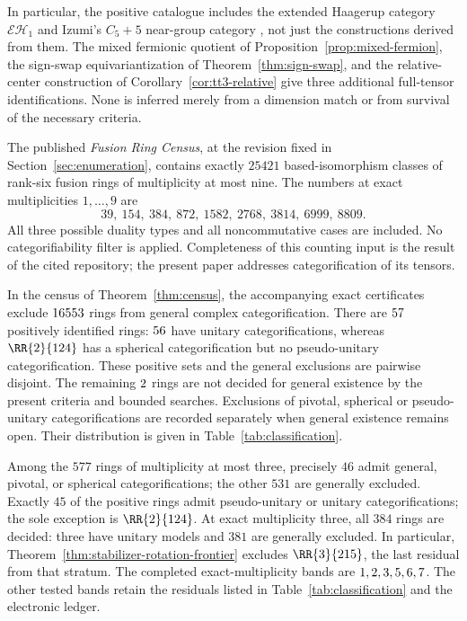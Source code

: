 In particular, the positive catalogue includes the extended Haagerup
category $\mathcal{EH}_1$ \cite{BMPS,BPEH} and Izumi's $C_5+5$ near-group
category \cite{Izumi}, not just the constructions derived from them.
The mixed fermionic quotient of Proposition~\ref{prop:mixed-fermion}, the
sign-swap equivariantization of Theorem~\ref{thm:sign-swap}, and the
relative-center construction of Corollary~\ref{cor:tt3-relative} give
three additional full-tensor identifications. None is inferred merely
from a dimension match or from survival of the necessary criteria.

\begin{theorem}\label{thm:census}
The published \emph{Fusion Ring Census}, at the revision fixed in
Section~\ref{sec:enumeration}, contains exactly $25421$
based-isomorphism classes of rank-six fusion rings of multiplicity at
most nine. The numbers at exact multiplicities $1,\ldots,9$ are
\[
39,\ 154,\ 384,\ 872,\ 1582,\ 2768,\ 3814,\ 6999,\ 8809.
\]
All three possible duality types and all noncommutative cases are
included. No categorifiability filter is applied. Completeness of this
counting input is the result of the cited repository; the present paper
addresses categorification of its tensors.
\end{theorem}

\begin{theorem}\label{thm:classification}
In the census of Theorem~\ref{thm:census}, the accompanying exact
certificates exclude $16553$ rings from general complex
categorification. There are $57$ positively identified rings:
$56$ have unitary categorifications, whereas $\RR{2}{124}$ has
a spherical categorification but no pseudo-unitary categorification.
These positive sets and the general exclusions are pairwise disjoint.
The remaining $2$ rings are not decided for general existence by the present criteria and bounded searches. Exclusions of pivotal, spherical or pseudo-unitary categorifications are recorded separately when general existence remains open. Their distribution is given in
Table~\ref{tab:classification}.

Among the $577$ rings of multiplicity at most three, precisely $46$
admit general, pivotal, or spherical categorifications; the other $531$
are generally excluded. Exactly $45$ of the positive rings admit
pseudo-unitary or unitary categorifications; the sole exception is
$\RR{2}{124}$. At exact multiplicity three, all $384$ rings are decided:
three have unitary models and $381$ are generally excluded. In particular,
Theorem~\ref{thm:stabilizer-rotation-frontier} excludes $\RR{3}{215}$,
the last residual from that stratum. The completed exact-multiplicity
bands are $1, 2, 3, 5, 6, 7$. The other tested bands retain the residuals
listed in Table~\ref{tab:classification} and the electronic ledger.
\end{theorem}

